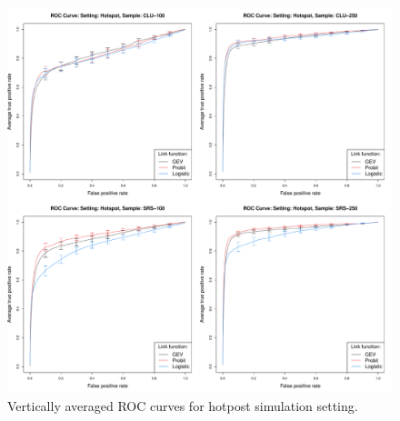 \documentclass[11pt]{article}
\begin{document}
\begin{figure}
  \includegraphics[width=\linewidth]{plots/sim-perf-hotspot}
  \caption{Vertically averaged ROC curves for hotpost simulation setting.}
  \label{rbfig:simrochot}
\end{figure}

\end{document}
